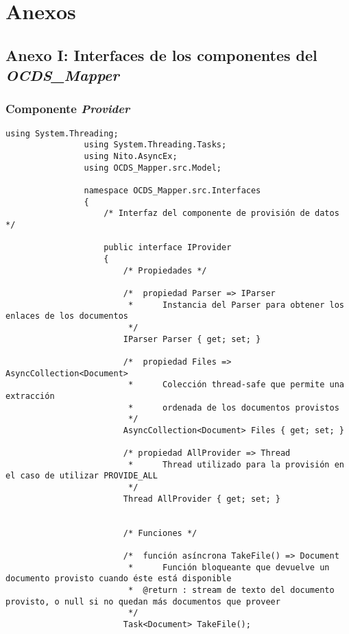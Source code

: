 \section{Anexos}

    \subsection{Anexo I: Interfaces de los componentes del \textit{OCDS\_Mapper}}
        \subsubsection{Componente \textit{Provider}}
            \begin{lstlisting}[language=lCSharp]
                using System.Threading;
                using System.Threading.Tasks;
                using Nito.AsyncEx;
                using OCDS_Mapper.src.Model;
                
                namespace OCDS_Mapper.src.Interfaces
                {
                    /* Interfaz del componente de provisión de datos */
                
                    public interface IProvider
                    {
                        /* Propiedades */
                
                        /*  propiedad Parser => IParser
                         *      Instancia del Parser para obtener los enlaces de los documentos
                         */
                        IParser Parser { get; set; }
                
                        /*  propiedad Files => AsyncCollection<Document>
                         *      Colección thread-safe que permite una extracción
                         *      ordenada de los documentos provistos
                         */
                        AsyncCollection<Document> Files { get; set; }
                
                        /* propiedad AllProvider => Thread
                         *      Thread utilizado para la provisión en el caso de utilizar PROVIDE_ALL
                         */
                        Thread AllProvider { get; set; }
                
                
                        /* Funciones */
                
                        /*  función asíncrona TakeFile() => Document
                         *      Función bloqueante que devuelve un documento provisto cuando éste está disponible
                         *  @return : stream de texto del documento provisto, o null si no quedan más documentos que proveer
                         */
                        Task<Document> TakeFile();
                

\end{lstlisting}
